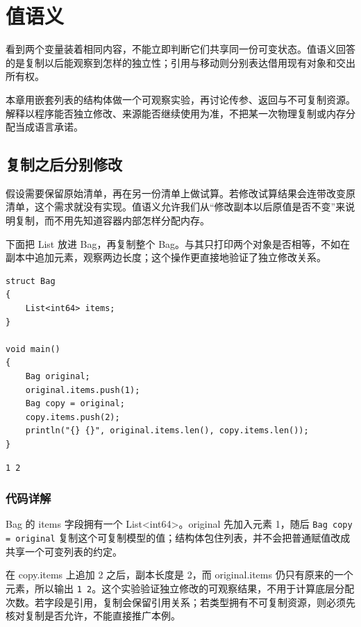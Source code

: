 \chapter{值语义}
\label{ch:06}

看到两个变量装着相同内容，不能立即判断它们共享同一份可变状态。值语义回答的是复制以后能观察到怎样的独立性；引用与移动则分别表达借用现有对象和交出所有权。

本章用嵌套列表的结构体做一个可观察实验，再讨论传参、返回与不可复制资源。解释以程序能否独立修改、来源能否继续使用为准，不把某一次物理复制或内存分配当成语言承诺。

\section{复制之后分别修改}

假设需要保留原始清单，再在另一份清单上做试算。若修改试算结果会连带改变原清单，这个需求就没有实现。值语义允许我们从“修改副本以后原值是否不变”来说明复制，而不用先知道容器内部怎样分配内存。

下面把 List 放进 Bag，再复制整个 Bag。与其只打印两个对象是否相等，不如在副本中追加元素，观察两边长度；这个操作更直接地验证了独立修改关系。

\par
\medskip
\begin{lstlisting}[style=chali]
struct Bag
{
    List<int64> items;
}

void main()
{
    Bag original;
    original.items.push(1);
    Bag copy = original;
    copy.items.push(2);
    println("{} {}", original.items.len(), copy.items.len());
}
\end{lstlisting}
\par
\medskip

\par
\medskip
\begin{lstlisting}[style=out]
1 2
\end{lstlisting}
\par
\medskip

\subsection*{代码详解}

Bag 的 items 字段拥有一个 List<int64>。original 先加入元素 1，随后 \texttt{Bag copy =\allowbreak{} original} 复制这个可复制模型的值；结构体包住列表，并不会把普通赋值改成共享一个可变列表的约定。

在 copy.items 上追加 2 之后，副本长度是 2，而 original.items 仍只有原来的一个元素，所以输出 \texttt{1 2}。这个实验验证独立修改的可观察结果，不用于计算底层分配次数。若字段是引用，复制会保留引用关系；若类型拥有不可复制资源，则必须先核对复制是否允许，不能直接推广本例。

